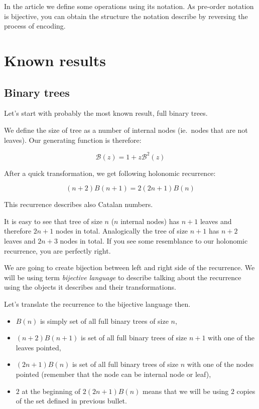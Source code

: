 \documentclass[final]{article}
\theoremstyle{definition}
\theoremstyle{remark}
\newcommand{\gf}[1]{\ensuremath{\mathcal{#1}}}
\begin{document}
In the article we define some operations using its notation. As pre-order notation is bijective, you can obtain the structure the notation describe by reversing the process of encoding.

\section{Known results}%
\label{sec:known_results}

\subsection{Binary trees}%
\label{sub:binary_trees}



Let's start with probably the most known result, full binary trees\cite{binary}.

We define the size of tree as a number of internal nodes (ie.\ nodes that are not leaves). Our generating function is therefore:

\[\gf{B}(z) = 1 + z\gf{B}^2(z)\]

After a quick transformation, we get following holonomic recurrence:

\[(n + 2)B(n + 1) = 2 (2n + 1)B(n)\]

This recurrence describes also Catalan numbers.

It is easy to see that tree of size \(n\) (\(n\) internal nodes) has \(n + 1\) leaves and therefore \(2n + 1\) nodes in total. Analogically the tree of size \(n + 1\) has \(n + 2\) leaves and \(2n + 3\) nodes in total. If you see some resemblance to our holonomic recurrence, you are perfectly right.

We are going to create bijection between left and right side of the recurrence. We will be using term \textit{bijective language} to describe talking about the recurrence using the objects it describes and their transformations.

Let's translate the recurrence to the bijective language then.
\begin{itemize}
    \item \(B(n)\) is simply set of all full binary trees of size \(n\),
    \item \((n + 2) B(n + 1)\) is set of all full binary trees of size \(n + 1\) with one of the leaves pointed,
    \item \((2n + 1) B(n)\) is set of all full binary trees of size \(n\) with one of the nodes pointed (remember that the node can be internal node or leaf),
    \item \(2\) at the beginning of \(2 (2n + 1) B(n)\) means that we will be using \(2\) copies of the set defined in previous bullet.
\end{itemize}
\end{document}
